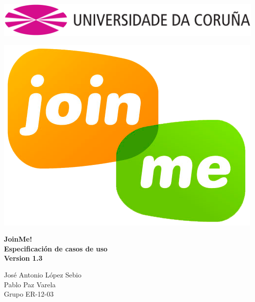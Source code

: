 \documentclass[12pt, a4paper, titlepage]{article}
\begin{document}

\begin{titlepage}

\includegraphics[width=15cm]{Imagenes/Simbolo_logo_UDC.png}

\vspace{3cm}

\begin{center}
\includegraphics[scale=0.3]{Imagenes/1a_Practica_ER_14-15.png}
\end{center}

\begin{flushright}
	\LARGE{\textbf{ JoinMe!}}\\
	\LARGE{\textbf{Especificación de casos de uso}}\\
	\large{\textbf{Version 1.3}}
	
		
\end{flushright}
\vspace{1cm}
\begin{center}
José Antonio López Sebio\\
Pablo Paz Varela\\
Grupo ER-12-03\\
\end{center}


\end{titlepage}
\end{document}
